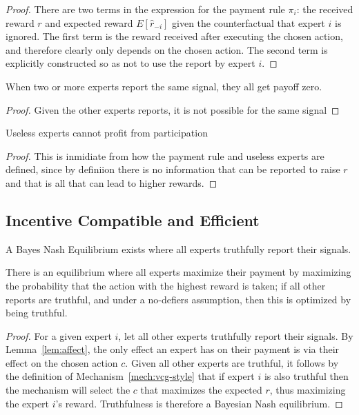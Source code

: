 \begin{proof}
There are two terms in the expression for the payment rule $\pi_i$: the received reward $r$ and expected reward $E[\hat{r}_{-i}]$ given the counterfactual that expert $i$ is ignored. 
The first term is the reward received after executing the chosen action, and therefore clearly only depends on the chosen action. 
The second term is explicitly constructed so as not to use the report by expert $i$. 
\end{proof}


\begin{lem}
	When two or more experts report the same signal, they all get payoff zero. 
\end{lem}

\begin{proof}
	Given the other experts reports, it is not possible for the same signal
\end{proof}

\begin{lem}
	Useless experts cannot profit from participation
\end{lem}

\begin{proof}
This is inmidiate from how the payment rule and useless experts are defined, since by definiion there is no information that can be reported to raise $r$ and that is all that can lead to higher rewards.
\end{proof}


\subsection{Incentive Compatible and Efficient}

\begin{thm}
	A Bayes Nash Equilibrium exists where all experts truthfully report their signals.
\end{thm}

There is an equilibrium where all experts maximize their payment by maximizing the probability that the action with the highest reward is taken; if all other reports are truthful, and under a no-defiers assumption, then this is optimized by being truthful.

\begin{proof}
For a given expert $i$, let all other experts truthfully report their signals. By Lemma~\ref{lem:affect}, the only effect an expert has on their payment is via their effect on the chosen action $c$. Given all other experts are truthful, it follows by the definition of Mechanism~\ref{mech:vcg-style} that if expert $i$ is also truthful then the mechanism will select the $c$ that maximizes the expected $r$, thus maximizing the expert $i$'s reward. Truthfulness is therefore a Bayesian Nash equilibrium.
\end{proof}

